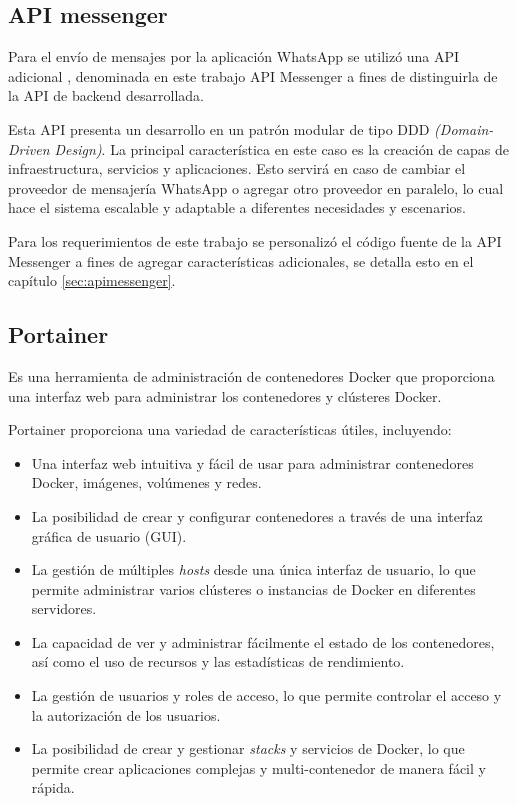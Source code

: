 \subsection{API messenger}
\label{subsec:apimessenger}

Para el envío de mensajes por la aplicación WhatsApp \cite{whatsapp} se utilizó una API adicional \cite{api-whatsapp-ts}, denominada en este trabajo API Messenger a fines de distinguirla de la API de backend desarrollada.

Esta API presenta un desarrollo en un patrón modular de tipo DDD \textit{(Domain-Driven Design)}. La principal característica en este caso es la creación de capas de infraestructura, servicios y aplicaciones. Esto servirá en caso de cambiar el proveedor de mensajería WhatsApp o agregar otro proveedor en paralelo, lo cual hace el sistema escalable y adaptable a diferentes necesidades y escenarios.

Para los requerimientos de este trabajo se personalizó el código fuente de la API Messenger a fines de agregar características adicionales, se detalla esto en el capítulo \ref{sec:apimessenger}.

\subsection{Portainer}
\label{subsec:portainer}

Es una herramienta de administración de contenedores Docker \cite{WEBSITE:docker} que proporciona una interfaz web para administrar los contenedores y clústeres Docker.

Portainer \citep{PortainerDocs} proporciona una variedad de características útiles, incluyendo:

\begin{itemize}
\item Una interfaz web intuitiva y fácil de usar para administrar contenedores Docker, imágenes, volúmenes y redes.
\item La posibilidad de crear y configurar contenedores a través de una interfaz gráfica de usuario (GUI).
\item La gestión de múltiples \textit{hosts} desde una única interfaz de usuario, lo que permite administrar varios clústeres o instancias de Docker en diferentes servidores.
\item La capacidad de ver y administrar fácilmente el estado de los contenedores, así como el uso de recursos y las estadísticas de rendimiento.
\item La gestión de usuarios y roles de acceso, lo que permite controlar el acceso y la autorización de los usuarios.
\item La posibilidad de crear y gestionar \textit{stacks} y servicios de Docker, lo que permite crear aplicaciones complejas y multi-contenedor de manera fácil y rápida.
\end{itemize}

